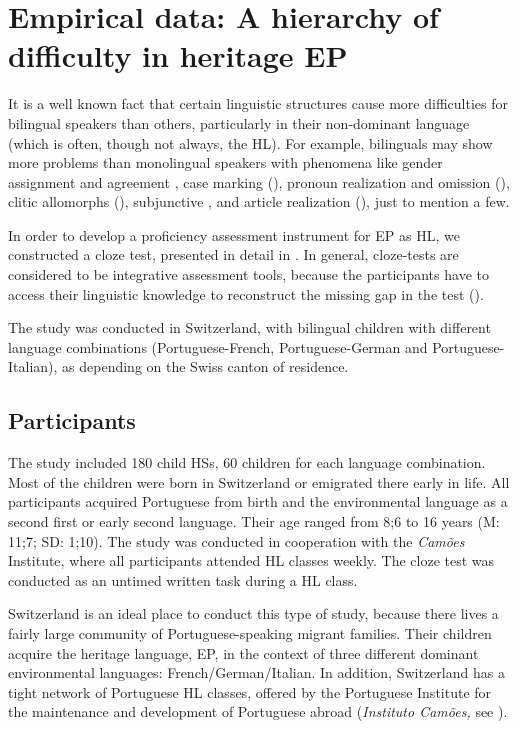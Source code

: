 \documentclass[output=paper]{langscibook}
\begin{document}
\section{Empirical data: A hierarchy of difficulty in heritage EP}\label{sec:rinke:2}

It is a well known fact that certain linguistic structures cause more difficulties for bilingual speakers than others, particularly in their non-dominant language (which is often, though not always, the HL). For example, bilinguals may show more problems than monolingual speakers with phenomena like gender assignment and agreement \citep{MontrulPerpiñán2008}, case marking (\citealt{Polinsky2006,Polinsky2008Heritage}), pronoun realization and omission (\citealt{TorregrossaTsimpli2019, TorregrossaTsimpli2021}), clitic allomorphs (\citealt{RinkeFlores2014}), subjunctive \citep{FloresMarques2017}, and article realization (\citealt{MontrulIonin2010}), just to mention a few. 

In order to develop a proficiency assessment instrument for EP as HL, we constructed a cloze test, presented in detail in \citet{TorregrossaRinke2022}. In general, cloze-tests are considered to be integrative assessment tools, because the participants have to access their linguistic knowledge to reconstruct the missing gap in the test (\citealt{ChungAhn2019}).

The study was conducted in Switzerland, with bilingual children with different language combinations (Portuguese-French, Por\-tu\-guese-Ger\-man and Por\-tu\-guese-Ital\-ian), as depending on the Swiss canton of residence.

\subsection{Participants}\label{sec:rinke:2.1}

The study included 180 child HSs, 60 children for each language combination. Most of the children were born in Switzerland or emigrated there early in life. All participants acquired Portuguese from birth and the environmental language as a second first or early second language. Their age ranged from 8;6 to 16 years (M: 11;7; SD: 1;10). The study was conducted in cooperation with the \textit{Camões} Institute, where all participants attended HL classes weekly. The cloze test was conducted as an untimed written task during a HL class.

Switzerland is an ideal place to conduct this type of study, because there lives a fairly large community of Portuguese-speaking migrant families. Their children acquire the heritage language, EP, in the context of three different dominant environmental languages: French\slash German\slash Italian. In addition, Switzerland has a tight network of Portuguese HL classes, offered by the Portuguese Institute for the maintenance and development of Portuguese abroad (\textit{Instituto Camões,} see \citealt{GonçalvesVinzentin2021}).
\end{document}
